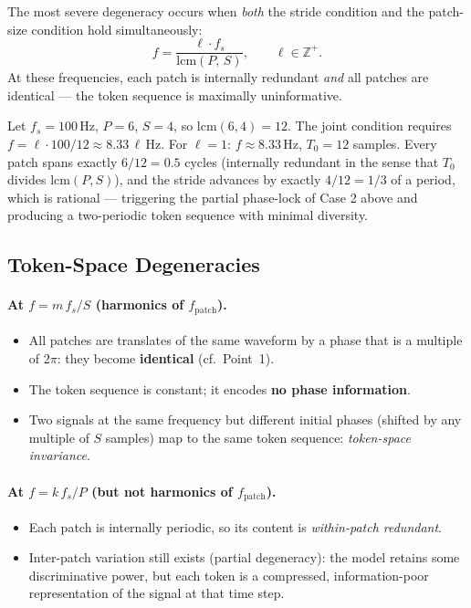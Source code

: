 The most severe degeneracy occurs when \emph{both} the stride condition and the patch-size
condition hold simultaneously:
\begin{equation}
	f = \frac{\ell \cdot f_s}{\mathrm{lcm}(P,\, S)},
	\qquad \ell \in \mathbb{Z}^+.
\end{equation}
At these frequencies, each patch is internally redundant \emph{and} all patches are
identical — the token sequence is maximally uninformative.

\begin{example}
	Let $f_s = 100\,\text{Hz}$, $P = 6$, $S = 4$,
	so $\mathrm{lcm}(6,4) = 12$.
	The joint condition requires $f = \ell \cdot 100/12 \approx 8.33\,\ell\,\text{Hz}$.
	For $\ell = 1$: $f \approx 8.33\,\text{Hz}$, $T_0 = 12$ samples.
	Every patch spans exactly $6/12 = 0.5$ cycles (internally redundant in the sense
	that $T_0$ divides $\mathrm{lcm}(P,S)$), and the stride advances by exactly
	$4/12 = 1/3$ of a period, which is rational — triggering the partial phase-lock of
	Case 2 above and producing a two-periodic token sequence with minimal diversity.
\end{example}

\subsection{Token-Space Degeneracies}

\paragraph{At $f = m\,f_s/S$ (harmonics of $f_{\mathrm{patch}}$).}
\begin{itemize}
	\item All patches are translates of the same waveform by a phase that is a multiple
	of $2\pi$: they become \textbf{identical} (cf.\ Point~1).
	\item The token sequence is constant; it encodes \textbf{no phase information}.
	\item Two signals at the same frequency but different initial phases (shifted by any
	multiple of $S$ samples) map to the same token sequence:
	\emph{token-space invariance}.
\end{itemize}

\paragraph{At $f = k\,f_s/P$ (but not harmonics of $f_{\mathrm{patch}}$).}
\begin{itemize}
	\item Each patch is internally periodic, so its content is \emph{within-patch
		redundant}.
	\item Inter-patch variation still exists (partial degeneracy): the model retains
	some discriminative power, but each token is a compressed, information-poor
	representation of the signal at that time step.
\end{itemize}

